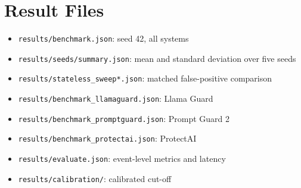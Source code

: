 \section{Result Files}
\begin{itemize}
\item \texttt{results/benchmark.json}: seed 42, all systems
\item \texttt{results/seeds/summary.json}: mean and standard deviation over five seeds
\item \texttt{results/stateless\_sweep*.json}: matched false-positive comparison
\item \texttt{results/benchmark\_llamaguard.json}: Llama Guard
\item \texttt{results/benchmark\_promptguard.json}: Prompt Guard 2
\item \texttt{results/benchmark\_protectai.json}: ProtectAI
\item \texttt{results/evaluate.json}: event-level metrics and latency
\item \texttt{results/calibration/}: calibrated cut-off
\end{itemize}
